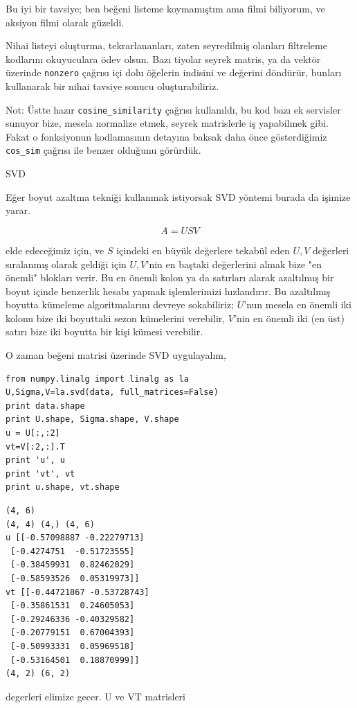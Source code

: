\documentclass[12pt,fleqn]{article}\usepackage{../../common}
\begin{document}
Bu iyi bir tavsiye; ben beğeni listeme koymamıştım ama filmi biliyorum,
ve aksiyon filmi olarak güzeldi.

Nihai listeyi oluşturma, tekrarlananları, zaten seyredilmiş olanları filtreleme
kodlarını okuyuculara ödev olsun. Bazı tiyolar seyrek matris, ya da vektör
üzerinde \verb!nonzero! çağrısı içi dolu öğelerin indisini ve değerini döndürür,
bunları kullanarak bir nihai tavsiye sonucu oluşturabiliriz.

Not: Üstte hazır \verb!cosine_similarity! çağrısı kullanıldı, bu kod bazı ek
servisler sunuyor bize, mesela normalize etmek, seyrek matrislerle iş yapabilmek
gibi. Fakat o fonksiyonun kodlamasının detayına baksak daha önce gösterdiğimiz
\verb!cos_sim! çağrısı ile benzer olduğunu görürdük.

SVD

Eğer boyut azaltma tekniği kullanmak istiyorsak SVD yöntemi burada da işimize
yarar.

$$ A = USV  $$

elde edeceğimiz için, ve $S$ içindeki en büyük değerlere tekabül eden
$U,V$ değerleri sıralanmış olarak geldiği için $U,V$'nin en baştaki
değerlerini almak bize "en önemli" blokları verir. Bu en önemli kolon
ya da satırları alarak azaltılmış bir boyut içinde benzerlik hesabı
yapmak işlemlerimizi hızlandırır. Bu azaltılmış boyutta kümeleme
algoritmalarını devreye sokabiliriz; $U$'nun mesela en önemli iki
kolonu bize iki boyuttaki sezon kümelerini verebilir, $V$'nin en
önemli iki (en üst) satırı bize iki boyutta bir kişi kümesi verebilir.

O zaman beğeni matrisi üzerinde SVD uygulayalım,

\begin{verbatim}
from numpy.linalg import linalg as la
U,Sigma,V=la.svd(data, full_matrices=False)
print data.shape
print U.shape, Sigma.shape, V.shape
u = U[:,:2]
vt=V[:2,:].T
print 'u', u
print 'vt', vt
print u.shape, vt.shape
\end{verbatim}

\begin{verbatim}
(4, 6)
(4, 4) (4,) (4, 6)
u [[-0.57098887 -0.22279713]
 [-0.4274751  -0.51723555]
 [-0.38459931  0.82462029]
 [-0.58593526  0.05319973]]
vt [[-0.44721867 -0.53728743]
 [-0.35861531  0.24605053]
 [-0.29246336 -0.40329582]
 [-0.20779151  0.67004393]
 [-0.50993331  0.05969518]
 [-0.53164501  0.18870999]]
(4, 2) (6, 2)
\end{verbatim}

degerleri elimize gecer. U ve VT matrisleri 
\end{document}

